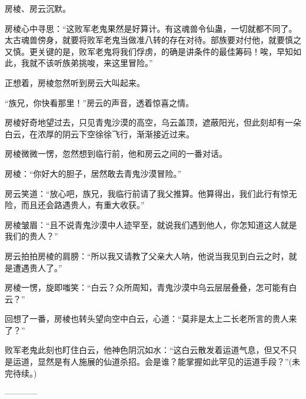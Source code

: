 \begin{this_body}
房棱、房云沉默。

房棱心中寻思：“这败军老鬼果然是好算计。有这魂兽令仙蛊，一切就都不同了。太古魂兽傍身，就要将败军老鬼当做准八转的存在对待。部族要对付他，就要慎之又慎。更关键的是，败军老鬼将我们俘虏，的确是讲条件的最佳筹码！唉，早知如此，我就不该听族弟挑唆，来这里冒险。”

正想着，房棱忽然听到房云大叫起来。

“族兄，你快看那里！”房云的声音，透着惊喜之情。

房棱好奇地望过去，只见青鬼沙漠的高空，乌云盖顶，遮蔽阳光，但此刻却有一朵白云，在浓厚的阴云下空徐徐飞行，渐渐接近过来。

房棱微微一愣，忽然想到临行前，他和房云之间的一番对话。

房棱：“你好大的胆子，居然敢去青鬼沙漠冒险。”

房云笑道：“放心吧，族兄，我临行前请了我父推算。他算得出，我们此行有惊无险，而且还会路遇贵人，有重大收获。”

房棱皱眉：“且不说青鬼沙漠中人迹罕至，就说我们遇到他人，你怎知道这人就是我们的贵人？”

房云拍拍房棱的肩膀：“所以我又请教了父亲大人呐，他说当我见到白云之时，就是遭遇贵人了。”

房棱一愣，旋即嗤笑：“白云？众所周知，青鬼沙漠中乌云层层叠叠，怎可能有白云？”

回想了一番，房棱也转头望向空中白云，心道：“莫非是太上二长老所言的贵人来了？”

败军老鬼此刻也盯住白云，他神色阴沉如水：“这白云散发着运道气息，但又不只是运道，显然是有人施展的仙道杀招。会是谁？能掌握如此罕见的运道手段？”(未完待续。)

------------

\end{this_body}

